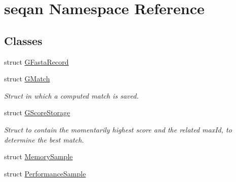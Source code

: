 \hypertarget{namespaceseqan}{\section{seqan Namespace Reference}
\label{namespaceseqan}
}
\subsection*{Classes}
\begin{DoxyCompactItemize}
\item 
struct \hyperlink{structseqan_1_1_g_fasta_record}{G\-Fasta\-Record}
\item 
struct \hyperlink{structseqan_1_1_g_match}{G\-Match}
\begin{DoxyCompactList}\small\item\em Struct in which a computed match is saved. \end{DoxyCompactList}\item 
struct \hyperlink{structseqan_1_1_g_score_storage}{G\-Score\-Storage}
\begin{DoxyCompactList}\small\item\em Struct to contain the momentarily highest score and the related max\-Id, to determine the best match. \end{DoxyCompactList}\item 
struct \hyperlink{structseqan_1_1_memory_sample}{Memory\-Sample}
\item 
struct \hyperlink{structseqan_1_1_performance_sample}{Performance\-Sample}
\end{DoxyCompactItemize}

